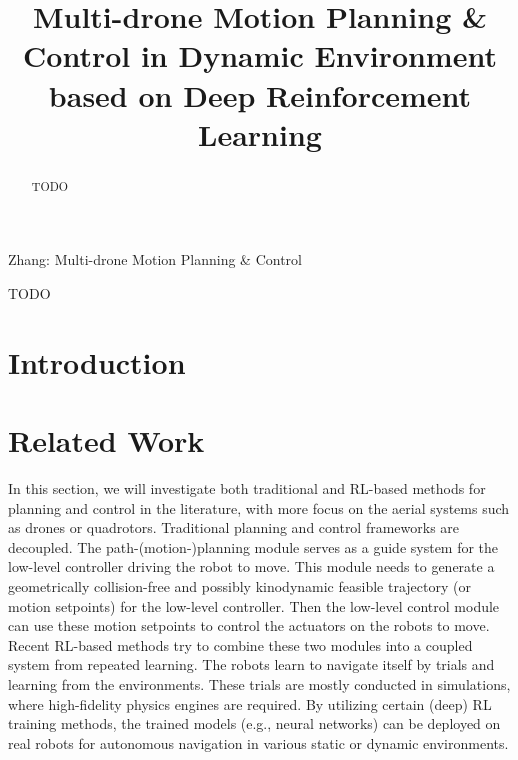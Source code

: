 \documentclass[letterpaper,journal,twoside]{IEEEtran}
\begin{document}
\title{Multi-drone Motion Planning \& Control in Dynamic Environment based on Deep Reinforcement Learning}

\author{
}

\maketitle

\begingroup
\renewcommand\thefootnote{\IEEEauthorrefmark{1}}
\endgroup

%
{Zhang: Multi-drone Motion Planning \& Control}



\begin{abstract}
TODO
\end{abstract}

\begin{IEEEkeywords}
  TODO
\end{IEEEkeywords}

\section{Introduction}

\section{Related Work}

In this section, we will investigate both traditional and RL-based methods for planning and control in the literature, with more focus on the aerial systems such as drones or quadrotors.
Traditional planning and control frameworks are decoupled.
The path-(motion-)planning module serves as a guide system for the low-level controller driving the robot to move. 
This module needs to generate a geometrically collision-free and possibly kinodynamic feasible trajectory (or motion setpoints) for the low-level controller.
Then the low-level control module can use these motion setpoints to control the actuators on the robots to move.
Recent RL-based methods try to combine these two modules into a coupled system from repeated learning. 
The robots learn to navigate itself by trials and learning from the environments.
These trials are mostly conducted in simulations, where high-fidelity physics engines are required. 
By utilizing certain (deep) RL training methods, the trained models (e.g., neural networks) can be deployed on real robots for autonomous navigation in various static or dynamic environments.
\end{document}
